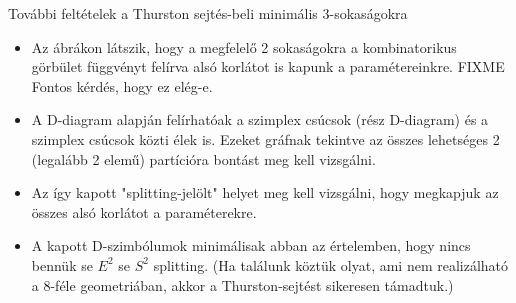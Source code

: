 \begin{frame}
  További feltételek a Thurston sejtés-beli minimális 3-sokaságokra
  \begin{itemize}
    \item Az ábrákon látszik, hogy a megfelelő 2 sokaságokra a kombinatorikus
      görbület függvényt felírva alsó korlátot is kapunk a paramétereinkre.
      FIXME Fontos kérdés, hogy ez elég-e.
    \item A D-diagram alapján felírhatóak a szimplex csúcsok (rész D-diagram) és
      a szimplex csúcsok közti élek is. Ezeket gráfnak tekintve az összes
      lehetséges 2 (legalább 2 elemű) partícióra bontást meg kell vizsgálni.
    \item Az így kapott "splitting-jelölt" helyet meg kell vizsgálni, hogy
      megkapjuk az összes alsó korlátot a paraméterekre.
    \item A kapott D-szimbólumok minimálisak abban az értelemben, hogy nincs
      bennük se $E^2$ se $S^2$ splitting. (Ha találunk köztük olyat, ami nem
      realizálható a 8-féle geometriában, akkor a Thurston-sejtést sikeresen
      támadtuk.)
  \end{itemize}
\end{frame}


